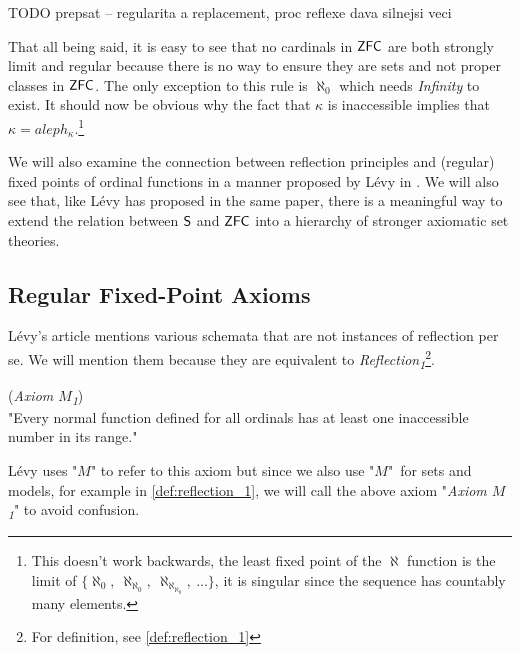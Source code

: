 TODO prepsat -- regularita a replacement, proc reflexe dava silnejsi veci

That all being said, it is easy to see that no cardinals in $\sf{ZFC}$ are both strongly limit and regular because there is no way to ensure they are sets and not proper classes in $\sf{ZFC}$. The only exception to this rule is $\aleph_0$ which needs \emph{Infinity} to exist. %
It should now be obvious why the fact that $\kappa$ is inaccessible implies that $\kappa = aleph_\kappa$.\footnote{This doesn't work backwards, the least fixed point of the $\aleph$ function is the limit of $\{\aleph_0,\ \aleph_{\aleph_0},\ \aleph_{\aleph_{\aleph_0}},\ \ldots \}$, it is singular since the sequence has countably many elements.}

We will also examine the connection between reflection principles and (regular) fixed points of ordinal functions in a manner proposed by Lévy in \cite{Levy60a}. We will also see that, like Lévy has proposed in the same paper, there is a meaningful way to extend the relation between $\sf{S}$ and $\sf{ZFC}$ into a hierarchy of stronger axiomatic set theories. 


\subsection{Regular Fixed-Point Axioms}

Lévy's article mentions various schemata that are not instances of reflection per se. We will mention them because they are equivalent to \emph{Reflection\textsubscript{1}}\footnote{For definition, see \ref{def:reflection_1}}.

\begin{definition}{(\emph{Axiom $M$\textsubscript{1}})}\label{def:levy_m}\\
"Every normal function defined for all ordinals has at least one inaccessible number in its range."
\end{definition}
Lévy uses "$M$" to refer to this axiom but since we also use "$M$" for sets and models, for example in \ref{def:reflection_1}, we will call the above axiom "\emph{Axiom $M$\textsubscript{1}}" to avoid confusion.

